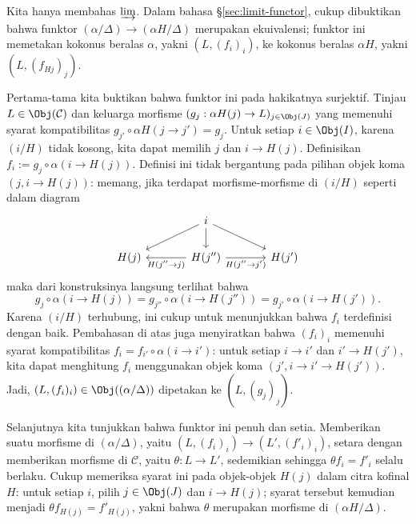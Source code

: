 \begin{bukti}
	Kita hanya membahas $\varinjlim$. Dalam bahasa
	\S\ref{sec:limit-functor}, cukup dibuktikan bahwa funktor
	$(\alpha/\Delta) \to (\alpha H / \Delta)$ merupakan ekuivalensi; funktor
	ini memetakan kokonus beralas $\alpha$, yakni $(L, (f_i)_i)$, ke kokonus
	beralas $\alpha H$, yakni $(L, (f_{Hj})_j)$.

	Pertama-tama kita buktikan bahwa funktor ini pada hakikatnya surjektif.
	Tinjau $L \in \Obj(\mathcal{C})$ dan keluarga morfisme
	$(g_j: \alpha H(j) \to L)_{j \in \Obj(J)}$ yang memenuhi syarat
	kompatibilitas $g_{j'} \circ \alpha H(j \to j') = g_j$. Untuk setiap
	$i \in \Obj(I)$, karena $(i/H)$ tidak kosong, kita dapat memilih $j$ dan
	$i \to H(j)$. Definisikan
	$f_i := g_j \circ \alpha(i \to H(j))$. Definisi ini tidak bergantung pada
	pilihan objek koma $(j,i \to H(j))$: memang, jika terdapat
	morfisme-morfisme di $(i/H)$ seperti dalam diagram
	\[\begin{tikzcd}[column sep=large]
		& i \arrow[ld] \arrow[d] \arrow[rd] & \\
		H(j) & H(j'') \arrow[l, "{H(j'' \to j)}"] \arrow[r, "{H(j'' \to j')}"'] & H(j')
	\end{tikzcd}\]
	maka dari konstruksinya langsung terlihat bahwa
	\[ g_j \circ \alpha(i\to H(j))
	= g_{j''} \circ \alpha(i\to H(j''))
	= g_{j'} \circ \alpha(i\to H(j')). \]
	Karena $(i/H)$ terhubung, ini cukup untuk menunjukkan bahwa $f_i$
	terdefinisi dengan baik. Pembahasan di atas juga menyiratkan bahwa
	$(f_i)_i$ memenuhi syarat kompatibilitas
	$f_i=f_{i'}\circ\alpha(i\to i')$: untuk setiap $i \to i'$ dan
	$i' \to H(j')$, kita dapat menghitung $f_i$ menggunakan objek koma
	$(j',i \to i' \to H(j'))$. Jadi,
	$(L, (f_i)_i) \in \Obj((\alpha/\Delta))$ dipetakan ke
	$(L, (g_j)_j)$.

	Selanjutnya kita tunjukkan bahwa funktor ini penuh dan setia. Memberikan
	suatu morfisme di $(\alpha/\Delta)$, yaitu
	$(L, (f_i)_i) \to (L', (f'_i)_i)$, setara dengan memberikan morfisme di
	$\mathcal{C}$, yaitu $\theta: L \to L'$, sedemikian sehingga
	$\theta f_i = f'_i$ selalu berlaku. Cukup memeriksa syarat ini pada
	objek-objek $H(j)$ dalam citra kofinal $H$: untuk setiap $i$, pilih
	$j \in \Obj(J)$ dan $i \to H(j)$; syarat tersebut kemudian menjadi
	$\theta f_{H(j)} = f'_{H(j)}$, yakni bahwa $\theta$ merupakan morfisme di
	$(\alpha H / \Delta)$.
\end{bukti}

